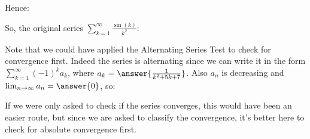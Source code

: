 \documentclass{ximera}
\begin{document}
\begin{exercise}
\begin{exercise}
Hence:

\begin{multipleChoice}
\end{multipleChoice}

So, the original series $\sum_{k=1}^{\infty} \frac{\sin(k)}{k^2}$:
\begin{multipleChoice}
\end{multipleChoice}

\begin{exercise}
Note that we could have applied the Alternating Series Test to check for convergence first.  Indeed the series is alternating since we can write it in the form $\sum_{k=1}^{\infty} (-1)^k a_k$, where $a_k = \answer{\frac{1}{k^2+5k+7}}$. Also $a_n$ is decreasing and $\lim_{n \to \infty} a_n = \answer{0}$, so:

\begin{multipleChoice}
\end{multipleChoice}

If we were only asked to check if the series converges, this would have been an easier route, but since we are asked to classify the convergence, it's better here to check for absolute convergence first.
\end{exercise}

\end{exercise}
\end{exercise}
\end{document}
